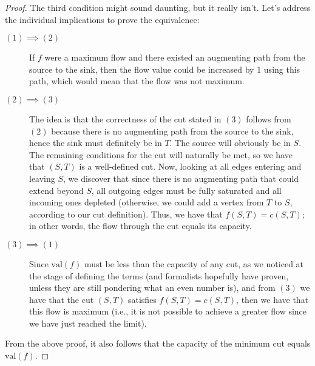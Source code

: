 \begin{proof}
    The third condition might sound daunting, but it really isn't. Let's address the individual implications to prove the equivalence:
    \begin{description}
        \item [$(1) \implies (2)$] If $f$ were a maximum flow and there existed an augmenting path from the source to the sink, then the flow value could be increased by 1 using this path, which would mean that the flow was not maximum.
        \item [$(2) \implies (3)$] The idea is that the correctness of the cut stated in $(3)$ follows from $(2)$ because there is no augmenting path from the source to the sink, hence the sink must definitely be in $T$. The source will obviously be in $S$. The remaining conditions for the cut will naturally be met, so we have that $(S,T)$ is a well-defined cut. Now, looking at all edges entering and leaving $S$, we discover that since there is no augmenting path that could extend beyond $S$, all outgoing edges must be fully saturated and all incoming ones depleted (otherwise, we could add a vertex from $T$ to $S$, according to our cut definition). Thus, we have that $f(S,T) = c(S,T)$; in other words, the flow through the cut equals its capacity.
        \item [$(3) \implies (1)$] Since $\mathrm{val}(f)$ must be less than the capacity of any cut, as we noticed at the stage of defining the terms (and formalists hopefully have proven, unless they are still pondering what an even number is), and from $(3)$ we have that the cut $(S,T)$ satisfies $f(S,T) = c(S,T)$, then we have that this flow is maximum (i.e., it is not possible to achieve a greater flow since we have just reached the limit).
        
    \end{description}

    From the above proof, it also follows that the capacity of the minimum cut equals $\mathrm{val}(f)$.
\end{proof}